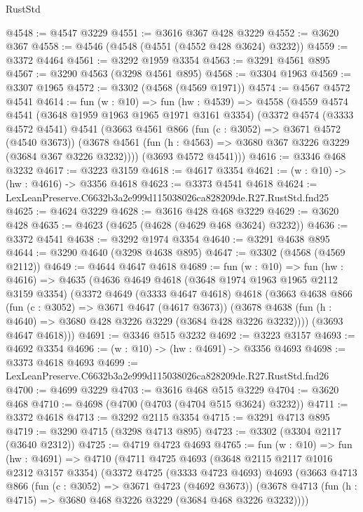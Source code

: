 \begin{lexlean}{RustStd}
\begin{coremodule}
@4548 := @4547 @3229
@4551 := @3616 @367 @428 @3229
@4552 := @3620 @367
@4558 := @4546 (@4548 (@4551 (@4552 @428 @3624) @3232))
@4559 := @3372 @4464
@4561 := @3292 @1959 @3354
@4563 := @3291 @4561 @895
@4567 := @3290 @4563 (@3298 @4561 @895)
@4568 := @3304 @1963
@4569 := @3307 @1965
@4572 := @3302 (@4568 (@4569 @1971))
@4574 := @4567 @4572 @4541
@4614 := fun (w : @10) =>
  fun (hw : @4539) =>
  @4558
    (@4559
      @4574
      @4541
      (@3648 @1959 @1963 @1965 @1971 @3161 @3354)
      (@3372
        @4574
        (@3333 @4572 @4541)
        @4541
        (@3663
          @4561
          @866
          (fun (c : @3052) => @3671 @4572 (@4540 @3673))
          (@3678 @4561 (fun (h : @4563) => @3680 @367 @3226 @3229 (@3684 @367 @3226 @3232))))
        (@3693 @4572 @4541)))
@4616 := @3346 @468 @3232
@4617 := @3223 @3159
@4618 := @4617 @3354
@4621 := (w : @10) -> (hw : @4616) -> @3356 @4618
@4623 := @3373 @4541 @4618
@4624 := LexLeanPreserve.C6632b3a2e999d115038026ca828209de.R27.RustStd.fnd25
@4625 := @4624 @3229
@4628 := @3616 @428 @468 @3229
@4629 := @3620 @428
@4635 := @4623 (@4625 (@4628 (@4629 @468 @3624) @3232))
@4636 := @3372 @4541
@4638 := @3292 @1974 @3354
@4640 := @3291 @4638 @895
@4644 := @3290 @4640 (@3298 @4638 @895)
@4647 := @3302 (@4568 (@4569 @2112))
@4649 := @4644 @4647 @4618
@4689 := fun (w : @10) =>
  fun (hw : @4616) =>
  @4635
    (@4636
      @4649
      @4618
      (@3648 @1974 @1963 @1965 @2112 @3159 @3354)
      (@3372
        @4649
        (@3333 @4647 @4618)
        @4618
        (@3663
          @4638
          @866
          (fun (c : @3052) => @3671 @4647 (@4617 @3673))
          (@3678 @4638 (fun (h : @4640) => @3680 @428 @3226 @3229 (@3684 @428 @3226 @3232))))
        (@3693 @4647 @4618)))
@4691 := @3346 @515 @3232
@4692 := @3223 @3157
@4693 := @4692 @3354
@4696 := (w : @10) -> (hw : @4691) -> @3356 @4693
@4698 := @3373 @4618 @4693
@4699 := LexLeanPreserve.C6632b3a2e999d115038026ca828209de.R27.RustStd.fnd26
@4700 := @4699 @3229
@4703 := @3616 @468 @515 @3229
@4704 := @3620 @468
@4710 := @4698 (@4700 (@4703 (@4704 @515 @3624) @3232))
@4711 := @3372 @4618
@4713 := @3292 @2115 @3354
@4715 := @3291 @4713 @895
@4719 := @3290 @4715 (@3298 @4713 @895)
@4723 := @3302 (@3304 @2117 (@3640 @2312))
@4725 := @4719 @4723 @4693
@4765 := fun (w : @10) =>
  fun (hw : @4691) =>
  @4710
    (@4711
      @4725
      @4693
      (@3648 @2115 @2117 @1016 @2312 @3157 @3354)
      (@3372
        @4725
        (@3333 @4723 @4693)
        @4693
        (@3663
          @4713
          @866
          (fun (c : @3052) => @3671 @4723 (@4692 @3673))
          (@3678 @4713 (fun (h : @4715) => @3680 @468 @3226 @3229 (@3684 @468 @3226 @3232))))

\end{coremodule}
\end{lexlean}
